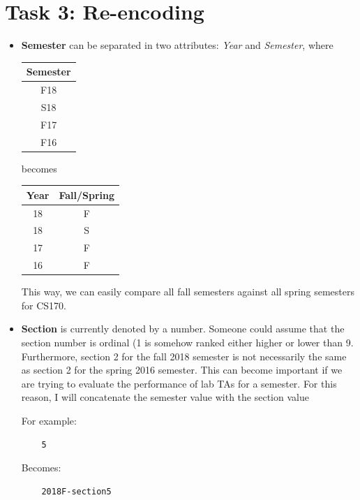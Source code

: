 \documentclass[12pt,letterpaper]{article}
\begin{document}
\section*{Task 3: Re-encoding}

\begin{itemize}
    \item 
    \textbf{Semester} can be separated in two attributes: \textit{Year} and \textit{Semester}, where
    
\begin{center}
 \begin{tabular}{| c |} 
 \hline
 Semester \\ [0.5ex] 
 \hline\hline
  F18 \\
  \hline
 S18 \\
 \hline
 F17 \\
 \hline
 F16 \\
 \hline
\end{tabular}

becomes
\vspace{1ex}

 \begin{tabular}{| c c |} 
 \hline
 Year & Fall/Spring \\ [0.5ex] 
 \hline\hline
  18 & F \\
  \hline
 18 & S \\
 \hline
 17 & F \\
 \hline
 16 & F \\
 \hline
\end{tabular}

\end{center}

This way, we can easily compare all fall semesters against all spring semesters for CS170.

\item
\textbf{Section} is currently denoted by a number. Someone could assume that the section number is ordinal (1 is somehow ranked either higher or lower than 9. Furthermore, section 2 for the fall 2018 semester is not necessarily the same as section 2 for the spring 2016 semester. This can become important if we are trying to evaluate the performance of lab TAs for a semester. For this reason, I will concatenate the semester value with the section value

For example:

\begin{verbatim}
    5
\end{verbatim}

Becomes:

\begin{verbatim}
    2018F-section5
\end{verbatim}
\end{itemize}
\end{document}
